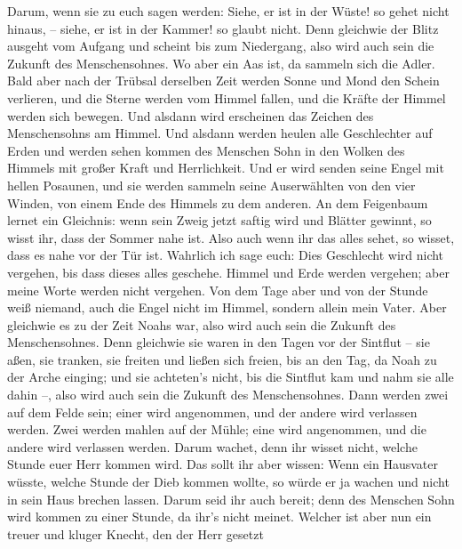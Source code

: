  Darum, wenn sie zu euch sagen werden: Siehe, er ist in
der Wüste! so gehet nicht hinaus, -- siehe, er ist in der Kammer! so
glaubt nicht.  Denn gleichwie der Blitz ausgeht vom
Aufgang und scheint bis zum Niedergang, also wird auch sein die Zukunft
des Menschensohnes.  Wo aber ein Aas ist, da sammeln sich
die Adler.  Bald aber nach der Trübsal derselben Zeit
werden Sonne und Mond den Schein verlieren, und die Sterne werden vom
Himmel fallen, und die Kräfte der Himmel werden sich bewegen.
 Und alsdann wird erscheinen das Zeichen des
Menschensohns am Himmel. Und alsdann werden heulen alle Geschlechter auf
Erden und werden sehen kommen des Menschen Sohn in den Wolken des
Himmels mit großer Kraft und Herrlichkeit.  Und er wird
senden seine Engel mit hellen Posaunen, und sie werden sammeln seine
Auserwählten von den vier Winden, von einem Ende des Himmels zu dem
anderen.  An dem Feigenbaum lernet ein Gleichnis: wenn
sein Zweig jetzt saftig wird und Blätter gewinnt, so wisst ihr, dass der
Sommer nahe ist.  Also auch wenn ihr das alles sehet, so
wisset, dass es nahe vor der Tür ist.  Wahrlich ich sage
euch: Dies Geschlecht wird nicht vergehen, bis dass dieses alles
geschehe.  Himmel und Erde werden vergehen; aber meine
Worte werden nicht vergehen.  Von dem Tage aber und von
der Stunde weiß niemand, auch die Engel nicht im Himmel, sondern allein
mein Vater.  Aber gleichwie es zu der Zeit Noahs war,
also wird auch sein die Zukunft des Menschensohnes.  Denn
gleichwie sie waren in den Tagen vor der Sintflut -- sie aßen, sie
tranken, sie freiten und ließen sich freien, bis an den Tag, da Noah zu
der Arche einging;  und sie achteten's nicht, bis die
Sintflut kam und nahm sie alle dahin --, also wird auch sein die Zukunft
des Menschensohnes.  Dann werden zwei auf dem Felde sein;
einer wird angenommen, und der andere wird verlassen werden.
 Zwei werden mahlen auf der Mühle; eine wird angenommen,
und die andere wird verlassen werden.  Darum wachet, denn
ihr wisset nicht, welche Stunde euer Herr kommen wird. 
Das sollt ihr aber wissen: Wenn ein Hausvater wüsste, welche Stunde der
Dieb kommen wollte, so würde er ja wachen und nicht in sein Haus brechen
lassen.  Darum seid ihr auch bereit; denn des Menschen
Sohn wird kommen zu einer Stunde, da ihr's nicht meinet. 
Welcher ist aber nun ein treuer und kluger Knecht, den der Herr gesetzt
